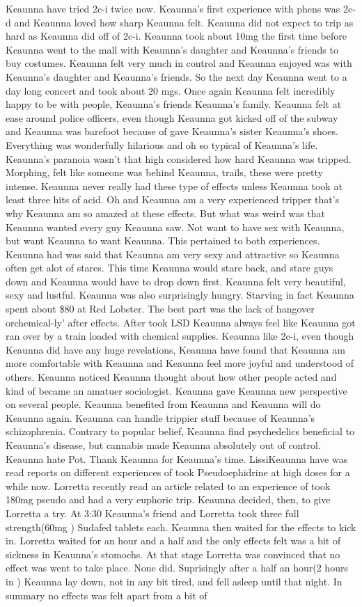 \documentclass[12pt]{book}
\begin{document}
Keaunna have tried 2c-i twice now. Keaunna's first experience with phens was 2c-d and Keaunna loved how sharp Keaunna felt. Keaunna did not expect to trip as hard as Keaunna did off of 2c-i. Keaunna took about 10mg the first time before Keaunna went to the mall with Keaunna's daughter and Keaunna's friends to buy costumes. Keaunna felt very much in control and Keaunna enjoyed was with Keaunna's daughter and Keaunna's friends. So the next day Keaunna went to a day long concert and took about 20 mgs. Once again Keaunna felt incredibly happy to be with people, Keaunna's friends Keaunna's family. Keaunna felt at ease around police officers, even though Keaunna got kicked off of the subway and Keaunna was barefoot because of gave Keaunna's sister Keaunna's shoes. Everything was wonderfully hilarious and oh so typical of Keaunna's life. Keaunna's paranoia wasn't that high considered how hard Keaunna was tripped. Morphing, felt like someone was behind Keaunna, trails, these were pretty intense. Keaunna never really had these type of effects unless Keaunna took at least three hits of acid. Oh and Keaunna am a very experienced tripper that's why Keaunna am so amazed at these effects. But what was weird was that Keaunna wanted every guy Keaunna saw. Not want to have sex with Keaunna, but want Keaunna to want Keaunna. This pertained to both experiences. Keaunna had was said that Keaunna am very sexy and attractive so Keaunna often get alot of stares. This time Keaunna would stare back, and stare guys down and Keaunna would have to drop down first. Keaunna felt very beautiful, sexy and lustful. Keaunna was also surprisingly hungry. Starving in fact Keaunna spent about \$80 at Red Lobster. The best part was the lack of hangover orchemical-ly' after effects. After took LSD Keaunna always feel like Keaunna got ran over by a train loaded with chemical supplies. Keaunna like 2c-i, even though Keaunna did have any huge revelations, Keaunna have found that Keaunna am more comfortable with Keaunna and Keaunna feel more joyful and understood of others. Keaunna noticed Keaunna thought about how other people acted and kind of became an amatuer sociologist. Keaunna gave Keaunna new perspective on several people. Keaunna benefited from Keaunna and Keaunna will do Keaunna again. Keaunna can handle trippier stuff because of Keaunna's schizophrenia. Contrary to popular belief, Keaunna find psychedelics beneficial to Keaunna's disease, but cannabis made Keaunna absolutely out of control. Keaunna hate Pot. Thank Keaunna for Keaunna's time. LissiKeaunna have was read reports on different experiences of took Pseudoephidrine at high doses for a while now. Lorretta recently read an article related to an experience of took 180mg pseudo and had a very euphoric trip. Keaunna decided, then, to give Lorretta a try. At 3:30 Keaunna's friend and Lorretta took three full strength(60mg ) Sudafed tablets each. Keaunna then waited for the effects to kick in. Lorretta waited for an hour and a half and the only effects felt was a bit of sickness in Keaunna's stomochs. At that stage Lorretta was convinced that no effect was went to take place. None did. Suprisingly after a half an hour(2 hours in ) Keaunna lay down, not in any bit tired, and fell asleep until that night. In summary no effects was felt apart from a bit of 
\end{document}
